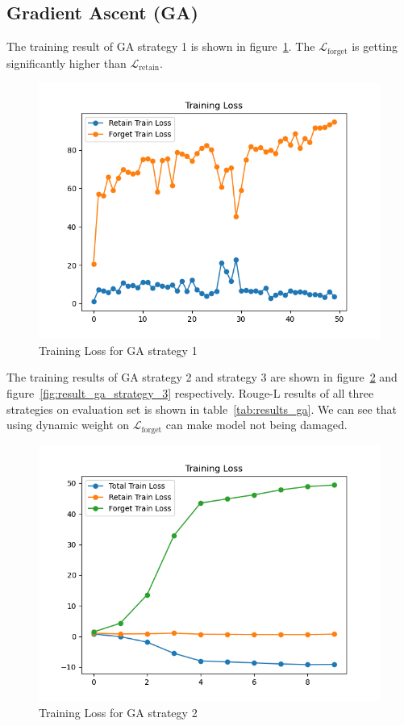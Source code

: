 \documentclass[11pt]{article}
\begin{document}
    \subsection{Gradient Ascent (GA)}

    The training result of GA strategy 1 is shown in figure~\ref{fig:result_ga_strategy_1}. The $\mathcal{L}_\text{forget}$ is getting significantly higher than $\mathcal{L}_\text{retain}$.

    \begin{figure}[!h]
        \centering
        \includegraphics[width=0.9\linewidth]{plot/ga_strategy_1.png}
        \caption{Training Loss for GA strategy 1}
        \label{fig:result_ga_strategy_1}
    \end{figure}

    The training results of GA strategy 2 and strategy 3 are shown in figure~\ref{fig:result_ga_strategy_2} and figure~\ref{fig:result_ga_strategy_3} respectively. Rouge-L results of all three strategies on evaluation set is shown in table~\ref{tab:results_ga}. We can see that using dynamic weight on $\mathcal{L}_\text{forget}$ can make model not being damaged.

    \begin{figure}
        \centering
        \includegraphics[width=0.9\linewidth]{plot/ga_strategy_2lambda_0.2.png}
        \caption{Training Loss for GA strategy 2}
        \label{fig:result_ga_strategy_2}
    \end{figure}
\end{document}
